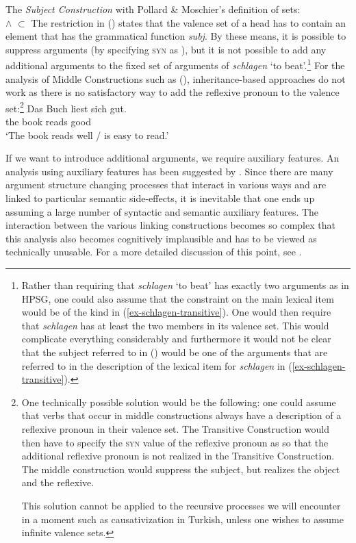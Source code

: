 \ea
The \emph{Subject Construction} with Pollard \& Moschier's definition of sets:\\
 $\wedge$  $\subset$ 
\z
The restriction in () states that the valence set of a head has to contain an element that has the grammatical function \emph{subj}.
By these means, it is possible to suppress arguments (by specifying \textsc{syn} as ),
but it is not possible to add any additional arguments to the fixed set of arguments of
\emph{schlagen} `to beat'.\footnote{%
  Rather than requiring that \emph{schlagen} `to beat' has exactly two arguments as in HPSG, one could also assume that the constraint on the main lexical item would be of the kind in
  (\ref{ex-schlagen-transitive}). One would then require that \emph{schlagen} has at least the two
members in its valence set. This would complicate everything considerably and furthermore it would
not be clear that the subject referred to in () would be one of the arguments that are
referred to in the description of the lexical item for \emph{schlagen} in (\ref{ex-schlagen-transitive}). 
}
For the analysis of Middle Constructions such as (), inheritance-based approaches do not work as there is no
satisfactory way to add the reflexive pronoun to the valence set:\footnote{%
	One technically possible solution would be the following: one could assume that verbs that occur in middle constructions always have a description
	of a reflexive pronoun in their valence set. The Transitive Construction would then have to
        specify the \textsc{syn} value of the reflexive pronoun
	as  so that the additional reflexive pronoun is not realized in the Transitive Construction. The middle construction would suppress the subject,
	but realizes the object and the reflexive.

		This solution cannot be applied to the recursive processes we will encounter in a moment such as causativization in Turkish, unless one
		wishes to assume infinite valence sets.
}
\ea
\gll Das Buch liest sich gut.\\
     the book reads \REFL{} good\\
\glt `The book reads well / is easy to read.'
\z

\noindent
If we want to introduce additional arguments, we require auxiliary features. An analysis using auxiliary features has been suggested by 
\citet{Koenig99a}. Since there are many argument structure changing processes that interact in various ways and are linked to particular
semantic side-effects, it is inevitable that one ends up assuming a large number of syntactic and semantic auxiliary features.
The interaction between the various linking constructions becomes so complex that this analysis also becomes cognitively implausible
and has to be viewed as technically unusable. For a more detailed discussion of this point, see .

